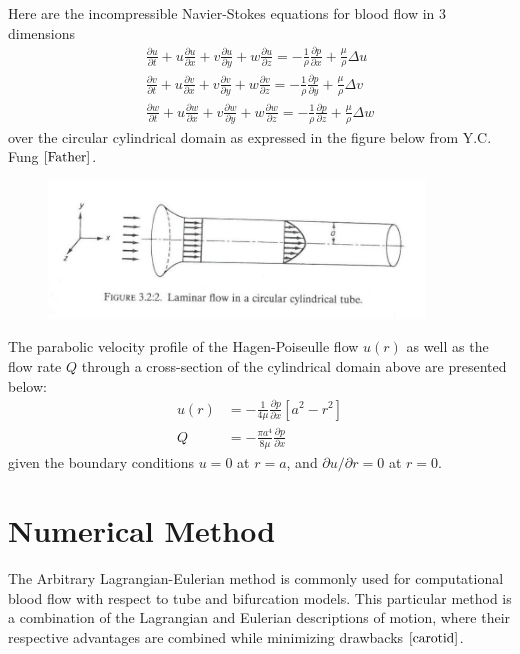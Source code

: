 \documentclass[12pt, a4paper]{article}
\theoremstyle{plain}
\theoremstyle{definition}
\theoremstyle{remark}
\begin{document}
\newpage

Here are the incompressible Navier-Stokes equations for blood flow in 3 dimensions
\begin{align}
\frac{\partial u}{\partial t} + u \frac{\partial u}{\partial x} + v \frac{\partial u}{\partial y} + w \frac{\partial u}{\partial z} = -\frac{1}{\rho} \frac{\partial p}{\partial x} + \frac{\mu}{\rho} \Delta u\\
\frac{\partial v}{\partial t} + u \frac{\partial v}{\partial x} + v \frac{\partial v}{\partial y} + w \frac{\partial v}{\partial z} = -\frac{1}{\rho} \frac{\partial p}{\partial y} + \frac{\mu}{\rho} \Delta v\\
\frac{\partial w}{\partial t} + u \frac{\partial w}{\partial x} + v \frac{\partial w}{\partial y} + w \frac{\partial w}{\partial z} = -\frac{1}{\rho} \frac{\partial p}{\partial z} + \frac{\mu}{\rho} \Delta w
\end{align}
over the circular cylindrical domain as expressed in the figure below from Y.C. Fung $\cite{Father}$.

\begin{figure}[ht!]
\centering
\includegraphics[width=100mm]{cardiovasculardomain.jpg}
\end{figure}
The parabolic velocity profile of the Hagen-Poiseulle flow $u(r)$ as well as the flow rate $Q$ through a cross-section of the cylindrical domain above are presented below:
\begin{align}
u(r)  &= - \frac{1}{4\mu} \frac{\partial p}{\partial x} \left[  a^2-r^2        \right] \\
Q     &=- \frac{\pi a^4}{8\mu} \frac{\partial p}{\partial x} 
\end{align}
given the boundary conditions $u=0$ at $r=a$, and $\partial u/\partial r  = 0$ at $r=0$.

\section{Numerical Method}


The Arbitrary Lagrangian-Eulerian method is commonly used for computational blood flow with respect to  tube and bifurcation models. This particular method is a combination of the Lagrangian and Eulerian descriptions of motion, where their respective advantages are combined while minimizing drawbacks $\cite{carotid}$. 
\end{document}

